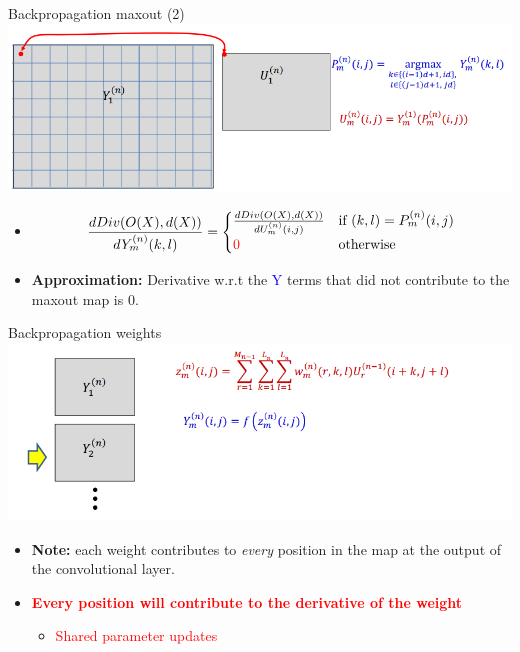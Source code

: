 \documentclass[serif, aspectratio=169]{beamer}
\begin{document}
	\begin{frame}{Backpropagation maxout (2)}
		\centering
		\includegraphics[keepaspectratio, scale=0.6]{pic/training4.png}
		\smallskip
		
		\begin{itemize}
			\item \[
			\frac{dDiv(O(X), d(X))}{dY^{(n)}_m (k,l)} = 
			\begin{cases} 
				\frac{dDiv(O(X), d(X))}{dU^{(n)}_m (i,j)} & \text{if } (k,l) = P^{(n)}_m (i,j) \\
				\textcolor{red}{0} & \text{otherwise}
			\end{cases}
			\]
			\item \textbf{Approximation:} Derivative w.r.t the \textcolor{blue}{Y} terms that did not contribute to the maxout map is 0.
		\end{itemize}
		
	\end{frame}
	\begin{frame}{Backpropagation weights}
		\centering
		\includegraphics[keepaspectratio, scale=0.6]{pic/training5.png}
		\smallskip
		
		\begin{itemize}
			\item \textbf{Note:} each weight contributes to \textit{every} position in the map at the output of the convolutional layer.
			\item \textcolor{red}{\textbf{Every position will contribute to the derivative of the weight}}
			\begin{itemize}
				\item \textcolor{red}{Shared parameter updates}
			
			\end{itemize}
		\end{itemize}
		
		
	\end{frame}
\end{document}
